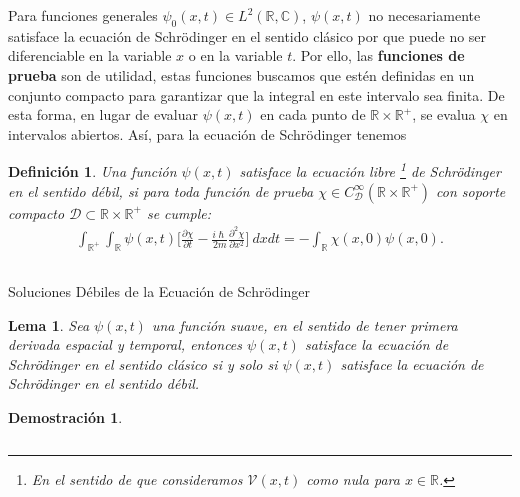 \documentclass[aspectratio=1610]{beamer}
\newcommand*{\field}[1]{\mathbb{#1}}
\newtheorem*{defn}{Definición}
\newtheorem*{lem}{Lema}
\newtheorem*{demo}{Demostración}
\begin{document}
\begin{frame}{}
   
Para funciones generales $\psi_{0}(x,t)\in L^2(\field{R},\field{C})$, $\psi(x,t)$ no necesariamente satisface la ecuación de Schrödinger en el sentido clásico por que puede no ser diferenciable en la variable $x$ o en la variable $t$.
Por ello, las \textbf{funciones de prueba} son de utilidad, estas funciones buscamos que estén definidas en un conjunto compacto para garantizar que la integral en este intervalo sea finita. De esta forma, en lugar de evaluar $\psi(x,t)$ en cada punto de $\field{R}\times\field{R}^{+}$, se evalua $\chi$ en intervalos abiertos. Así, para la ecuación de Schrödinger tenemos 

\begin{defn}
        Una función $\psi(x,t)$ satisface la ecuación libre \footnote{En el sentido de que consideramos $\mathcal{V}(x,t)$ como nula para $x\in\field{R}$.}  de Schrödinger en el sentido débil, si para toda función de prueba $\chi \in C_{\mathcal{D}}^{\infty}(\field{R}\times\field{R}^{+})$ con soporte compacto $\mathcal{D}\subset \field{R}\times\field{R}^{+}$ se cumple:
        \begin{align} \int_{\field{R}^+}\int_{\field{R}}\psi(x,t)\bigg[\frac{\partial\chi}{\partial t}-\frac{i\hslash}{2m}\frac{\partial ^2\chi}{\partial x^2}\bigg]\:dxdt = -\int_{\field{R}}\chi(x,0)\psi(x,0). \label{eq:Soldebil}
        \end{align}
        \label{lem:Rev5}
\end{defn}
    
\begin{columns}
\column{37em}
\end{columns}
\end{frame}

\begin{frame}{Soluciones Débiles de la Ecuación de Schrödinger}
   
\begin{lem}
    Sea $\psi(x,t)$ una función suave, en el sentido de tener primera derivada espacial y temporal, entonces $\psi(x,t)$ satisface la ecuación de Schrödinger en el sentido clásico si y solo si $\psi(x,t)$ satisface la ecuación de Schrödinger en el sentido débil.
\end{lem}

\begin{demo}
    
\end{demo}
    
\begin{columns}
\column{37em}
\end{columns}
\end{frame}
\end{document}
